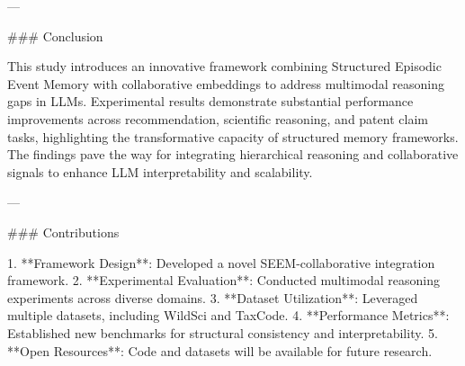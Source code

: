 ---

### Conclusion  

This study introduces an innovative framework combining Structured Episodic Event Memory with collaborative embeddings to address multimodal reasoning gaps in LLMs. Experimental results demonstrate substantial performance improvements across recommendation, scientific reasoning, and patent claim tasks, highlighting the transformative capacity of structured memory frameworks. The findings pave the way for integrating hierarchical reasoning and collaborative signals to enhance LLM interpretability and scalability.

---

### Contributions  

1. **Framework Design**: Developed a novel SEEM-collaborative integration framework.  
2. **Experimental Evaluation**: Conducted multimodal reasoning experiments across diverse domains.  
3. **Dataset Utilization**: Leveraged multiple datasets, including WildSci and TaxCode.  
4. **Performance Metrics**: Established new benchmarks for structural consistency and interpretability.  
5. **Open Resources**: Code and datasets will be available for future research.  

